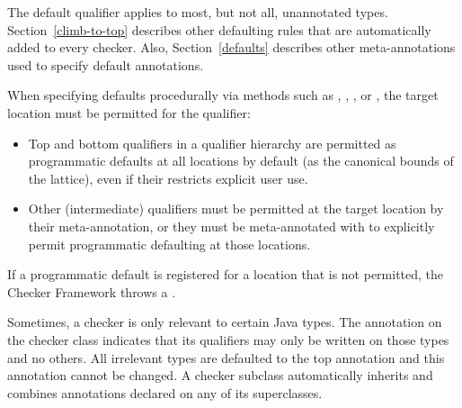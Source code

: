 The default qualifier applies to most, but not all, unannotated types.
Section~\ref{climb-to-top} describes
other defaulting rules that are automatically added to every checker.
Also, Section~\ref{defaults}
describes other meta-annotations used to specify default annotations.

When specifying defaults procedurally via methods such as
,
,
, or
,
the target location must be permitted for the qualifier:
\begin{itemize}
\item Top and bottom qualifiers in a qualifier hierarchy are permitted as programmatic defaults at all locations by default (as the canonical bounds of the lattice), even if their  restricts explicit user use.
\item Other (intermediate) qualifiers must be permitted at the target location by their  meta-annotation, or they must be meta-annotated with  to explicitly permit programmatic defaulting at those locations.
\end{itemize}
If a programmatic default is registered for a location that is not permitted, the Checker Framework throws a .


Sometimes, a checker is only relevant to certain Java types.
The 
annotation on the checker class indicates that its qualifiers may only be
written on those types and no others.  All irrelevant types are defaulted to
the top annotation and this annotation cannot be changed.
A checker subclass automatically inherits and combines
 annotations declared on any of its superclasses.

